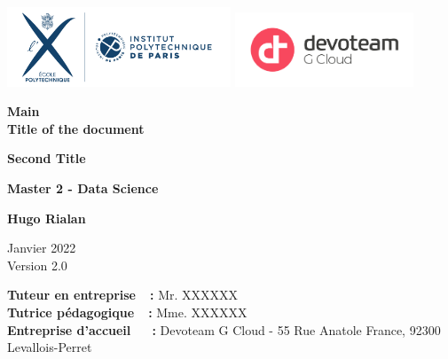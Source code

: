 \documentclass[11pt, oneside]{article}
\begin{document}
\begin{titlepage}
    \includegraphics[width=0.5\textwidth]{images/ipparis_logo.png}
    \hspace{0.7cm}
    \includegraphics[width=0.4\textwidth]{images/devoteam_gcloud_logo.png}

    \begin{center}
        \vspace{3cm}        
        \Huge{\textbf{Main \\ Title of the document}}
        
        \vspace{0.5cm}
        \Large{\textbf{Second Title}}
        
        \vspace{2.5cm}
        \Large{\textbf{Master 2 - Data Science}}
            
        \vspace{1.5cm}
        \Large{\textbf{Hugo Rialan}}
        
        \vspace{0.5cm}    
        \large{Janvier 2022} \\
        \large{Version 2.0}

    \end{center}

    \vfill
    
    \noindent
    \textbf{Tuteur en entreprise\ \ :} Mr. XXXXXX \\
    \textbf{Tutrice pédagogique\ \  :} Mme. XXXXXX \\
    \textbf{Entreprise d'accueil\ \ \ :} Devoteam G Cloud - 55 Rue Anatole France, 92300 Levallois-Perret
    
    \vspace{1cm}  
        
\end{titlepage}

\vspace*{2cm}
\renewcommand{\contentsname}{Table of contents}
\tableofcontents
\newpage
\end{document}
